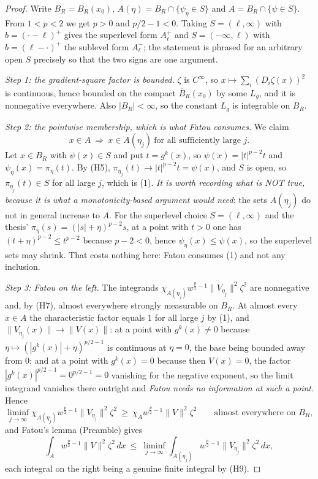 \begin{proof}
Write $B_R=B_R(x_0)$, $A(\eta)=B_R\cap\{\psi_\eta\in S\}$ and
$A=B_R\cap\{\psi\in S\}$.  From $1<p<2$ we get $p>0$ and $p/2-1<0$.  Taking
$S=(\ell,\infty)$ with $b=(\cdot-\ell)^{+}$ gives the superlevel form
$A^{+}_\ell$ and $S=(-\infty,\ell)$ with $b=(\ell-\cdot)^{+}$ the sublevel form
$A^{-}_\ell$; the statement is phrased for an arbitrary open $S$ precisely so
that the two signs are one argument.

\emph{Step 1: the gradient-square factor is bounded.}  $\zeta$ is $C^\infty$,
so $x\mapsto\sum_i(D_i\zeta(x))^2$ is continuous, hence bounded on the compact
$\overline B_R(x_0)$ by some $L_g$, and it is nonnegative everywhere.  Also
$|B_R|<\infty$, so the constant $L_g$ is integrable on $B_R$.

\emph{Step 2: the pointwise membership, which is what Fatou consumes.}  We
claim
\[
x\in A\ \Longrightarrow\ x\in A(\eta_j)\ \text{for all sufficiently large }j .
\tag{1}
\]
Let $x\in B_R$ with $\psi(x)\in S$ and put $t=g^k(x)$, so $\psi(x)=|t|^{p-2}t$
and $\psi_{\eta}(x)=\pi_{\eta}(t)$.  By (H5), $\pi_{\eta_j}(t)\to|t|^{p-2}t
=\psi(x)$, and $S$ is open, so $\pi_{\eta_j}(t)\in S$ for all large $j$, which
is (1).  \emph{It is worth recording what is NOT true, because it is what a
monotonicity-based argument would need}: the sets $A(\eta_j)$ do not in general
increase to $A$.  For the superlevel choice $S=(\ell,\infty)$ and the thesis'
$\pi_\eta(s)=(|s|+\eta)^{p-2}s$, at a point with $t>0$ one has
$(t+\eta)^{p-2}\le t^{p-2}$ because $p-2<0$, hence $\psi_\eta(x)\le\psi(x)$, so
the superlevel sets may shrink.  That costs nothing here: Fatou consumes (1)
and not any inclusion.

\emph{Step 3: Fatou on the left.}  The integrands
$\chi_{A(\eta_j)}w^{\frac p2-1}\|V_{\eta_j}\|^2\zeta^2$ are nonnegative and,
by (H7), almost everywhere strongly measurable on $B_R$.  At almost every
$x\in A$ the characteristic factor equals $1$ for all large $j$ by (1), and
$\|V_{\eta_j}(x)\|\to\|V(x)\|$: at a point with $g^k(x)\ne0$ because
$\eta\mapsto(|g^k(x)|+\eta)^{p/2-1}$ is continuous at $\eta=0$, the base being
bounded away from $0$; and at a point with $g^k(x)=0$ because then
$V(x)=0$, the factor $|g^k(x)|^{p/2-1}=0^{p/2-1}=0$ vanishing for the negative
exponent, so the limit integrand vanishes there outright and \emph{Fatou needs
no information at such a point}.  Hence
\[
\liminf_{j\to\infty}\chi_{A(\eta_j)}w^{\frac p2-1}\|V_{\eta_j}\|^2\zeta^2
\ \ge\ \chi_{A}w^{\frac p2-1}\|V\|^2\zeta^2
\qquad\text{almost everywhere on }B_R ,
\]
and Fatou's lemma (Preamble) gives
\[
\int_{A}w^{\frac p2-1}\|V\|^2\zeta^2\,dx
\ \le\ \liminf_{j\to\infty}\int_{A(\eta_j)}
w^{\frac p2-1}\|V_{\eta_j}\|^2\zeta^2\,dx ,
\tag{2}
\]
each integral on the right being a genuine finite integral by (H9).


\end{proof}
